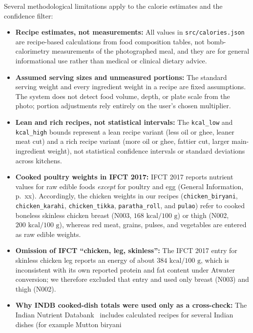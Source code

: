 Several methodological limitations apply to the calorie estimates and the
confidence filter:
\begin{itemize}
  \item \textbf{Recipe estimates, not measurements:} All values in
        \texttt{src/calories.json} are recipe-based calculations from food
        composition tables, not bomb-calorimetry measurements of the photographed
        meal, and they are for general informational use rather than medical or
        clinical dietary advice.
  \item \textbf{Assumed serving sizes and unmeasured portions:} The standard
        serving weight and every ingredient weight in a recipe are fixed
        assumptions. The system does not detect food volume, depth, or plate
        scale from the photo; portion adjustments rely entirely on the user's
        chosen multiplier.
  \item \textbf{Lean and rich recipes, not statistical intervals:} The
        \texttt{kcal\_low} and \texttt{kcal\_high} bounds represent a lean recipe
        variant (less oil or ghee, leaner meat cut) and a rich recipe variant
        (more oil or ghee, fattier cut, larger main-ingredient weight), not
        statistical confidence intervals or standard deviations across kitchens.
  \item \textbf{Cooked poultry weights in IFCT 2017:} IFCT 2017 reports nutrient
        values for raw edible foods \emph{except} for poultry and egg (General
        Information, p.~xx). Accordingly, the chicken weights in our recipes
        (\texttt{chicken\_biryani}, \texttt{chicken\_karahi},
        \texttt{chicken\_tikka}, \texttt{paratha\_roll}, and \texttt{pulao})
        refer to cooked boneless skinless chicken breast (N003,
        $168\text{ kcal/100 g}$) or thigh (N002, $200\text{ kcal/100 g}$),
        whereas red meat, grains, pulses, and vegetables are entered as raw
        edible weights.
  \item \textbf{Omission of IFCT ``chicken, leg, skinless'':} The IFCT 2017
        entry for skinless chicken leg reports an energy of about
        $384\text{ kcal/100 g}$, which is inconsistent with its own reported
        protein and fat content under Atwater conversion; we therefore excluded
        that entry and used only breast (N003) and thigh (N002).
  \item \textbf{Why INDB cooked-dish totals were used only as a cross-check:}
        The Indian Nutrient Databank~\cite{vijayakumar2024indb} includes
        calculated recipes for several Indian dishes (for example Mutton biryani

\end{itemize}
